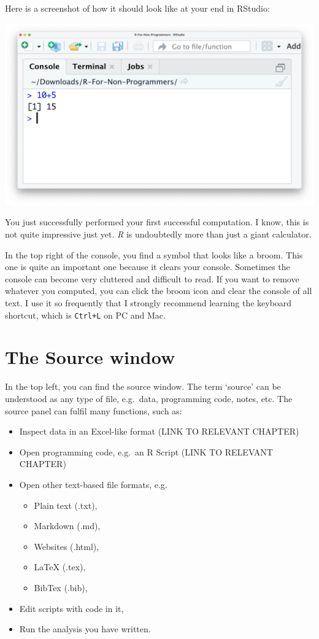 \documentclass[
]{book}
\begin{document}
Here is a screenshot of how it should look like at your end in RStudio:

\includegraphics{images/chapter_04_img/02_console_window/console_algebra.png}

You just successfully performed your first successful computation. I know, this is not quite impressive just yet. \emph{R} is undoubtedly more than just a giant calculator.

In the top right of the console, you find a symbol that looks like a broom. This one is quite an important one because it clears your console. Sometimes the console can become very cluttered and difficult to read. If you want to remove whatever you computed, you can click the broom icon and clear the console of all text. I use it so frequently that I strongly recommend learning the keyboard shortcut, which is \texttt{Ctrl+L} on PC and Mac.

\hypertarget{the-source-window}{%
\section{The Source window}\label{the-source-window}}

In the top left, you can find the source window. The term `source' can be understood as any type of file, e.g.~data, programming code, notes, etc. The source panel can fulfil many functions, such as:

\begin{itemize}
\item
  Inspect data in an Excel-like format (LINK TO RELEVANT CHAPTER)
\item
  Open programming code, e.g.~an R Script (LINK TO RELEVANT CHAPTER)
\item
  Open other text-based file formats, e.g.

  \begin{itemize}
  \item
    Plain text (.txt),
  \item
    Markdown (.md),
  \item
    Websites (.html),
  \item
    LaTeX (.tex),
  \item
    BibTex (.bib),
  \end{itemize}
\item
  Edit scripts with code in it,
\item
  Run the analysis you have written.
\end{itemize}
\end{document}
